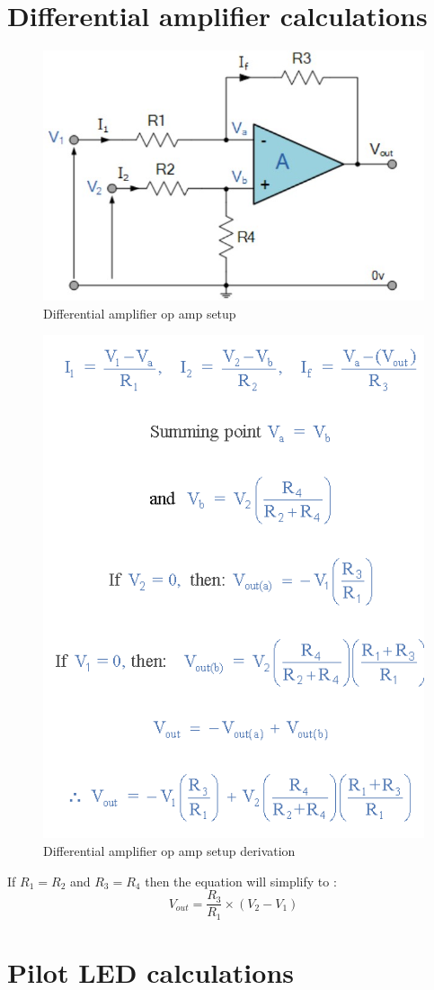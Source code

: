 \chapter{Differential amplifier calculations}
\begin{figure}[!htb]
	\centering
	\includegraphics[width=0.4\linewidth]{Figures/A6/difamp.jpg}
	\caption[Differential amplifier op amp setup]{Differential amplifier op amp setup\cite{difAmp} }
	\label{fig:difamp2}
\end{figure}

\begin{figure}[!htb]
	\centering
	\includegraphics[width=0.4\linewidth]{Figures/A6/derive.png}
	\caption[Differential amplifier op amp setup derivation]{Differential amplifier op amp setup derivation\cite{difAmp} }
	\label{fig:derive}
\end{figure}


If $R_1=R_2$ and $R_3=R_4$ then the equation will simplify to :
\begin{equation}
	V_{out}=\frac{R_3}{R_1}\times(V_2-V_1)
\end{equation}

\chapter{Pilot LED calculations}

\label{appen:E}

